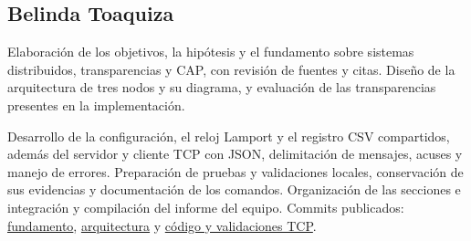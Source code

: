 \begin{samepage}
\subsection{Belinda Toaquiza}
Elaboración de los objetivos, la hipótesis y el fundamento sobre sistemas
distribuidos, transparencias y CAP, con revisión de fuentes y citas. Diseño
de la arquitectura de tres nodos y su diagrama, y evaluación de las
transparencias presentes en la implementación.

Desarrollo de la configuración, el reloj Lamport y el registro CSV compartidos,
además del servidor y cliente TCP con JSON, delimitación de mensajes, acuses
y manejo de errores. Preparación de pruebas y validaciones locales, conservación
de sus evidencias y documentación de los comandos. Organización de las secciones
e integración y compilación del informe del equipo. Commits publicados:
\href{https://github.com/BelindaTZ/GA-SUM-02-PE-U1/commit/b4662e5cc14dbd407fc1e2a205636fb088bde736}{fundamento},
\href{https://github.com/BelindaTZ/GA-SUM-02-PE-U1/commit/3aa884ab78f46509769b4ccaa4522ce5278bf389}{arquitectura}
y \href{https://github.com/BelindaTZ/GA-SUM-02-PE-U1/commit/4f6eda35ac8bb6306dc2cb202c6036ce1b79d637}{código y validaciones TCP}.
\par
\end{samepage}
